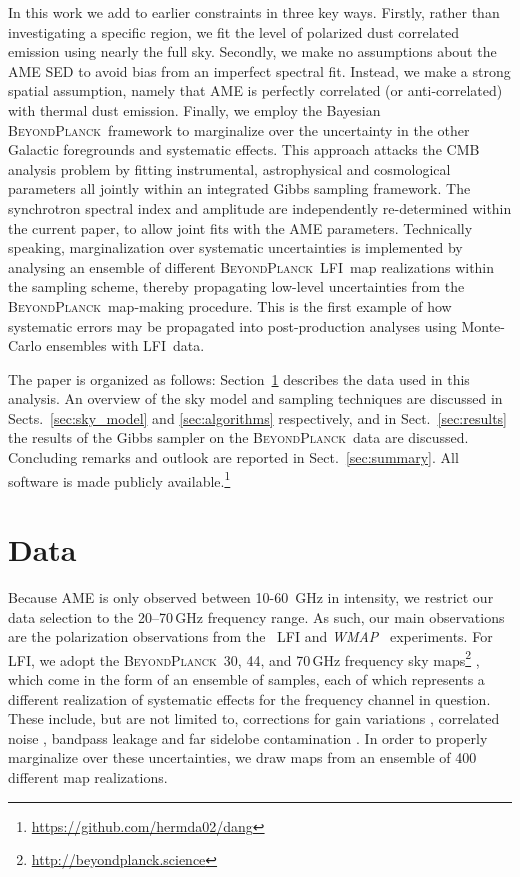 \documentclass[twocolumn]{aa}
\def\WMAP{\textit{WMAP}}
\newcommand{\BP}{\textsc{BeyondPlanck}}
\newcommand{\lfi}[0]{LFI}
\begin{document}
In this work we add to earlier constraints in three key ways. Firstly, rather than investigating a specific region, we fit the level of polarized dust correlated emission using nearly the full sky. Secondly, we make no assumptions about the AME SED to avoid bias from an imperfect spectral fit. Instead, we make a strong spatial assumption, namely that AME is perfectly correlated (or anti-correlated) with thermal dust emission. Finally, we employ the Bayesian \BP\ framework \citep{bp01} to marginalize over the uncertainty in the other Galactic foregrounds and systematic effects. This approach attacks the CMB analysis problem by fitting instrumental, astrophysical and cosmological parameters all jointly within an integrated Gibbs sampling framework. The synchrotron spectral index and amplitude are independently re-determined within the current paper, to allow joint fits with the AME parameters. Technically speaking, marginalization over systematic uncertainties is implemented by analysing an ensemble of different \BP\ \lfi\ map realizations within the sampling scheme, thereby propagating low-level uncertainties from the \BP\ map-making procedure. This is the first example of how systematic errors may be propagated into post-production analyses using Monte-Carlo ensembles with \lfi\ data.

The paper is organized as follows: Section~\ref{sec:data} describes the data used in this analysis. An overview of the sky model and sampling techniques are discussed in Sects.~\ref{sec:sky_model} and \ref{sec:algorithms} respectively, and in Sect.~\ref{sec:results} the results of the Gibbs sampler on the \BP\ data are discussed. Concluding remarks and outlook are reported in Sect.~\ref{sec:summary}. All software is made  publicly available.\footnote{\url{https://github.com/hermda02/dang}}

\section{Data}
\label{sec:data}

Because AME is only observed between 10-60~GHz in intensity, we restrict our data selection to the 20--70\,GHz frequency range. As such, our main observations are the polarization observations from the \Planck\ LFI \citep{planck2016-l02} and \WMAP\ \citep{bennett2012} experiments. For LFI, we adopt the \BP\ 30, 44, and 70\,GHz frequency sky maps\footnote{\url{http://beyondplanck.science}} \citep{bp01}, which come in the form of an ensemble of samples, each of which represents a different realization of systematic effects for the frequency channel in question. These include, but are not limited to, corrections for gain variations \citep{bp07}, correlated noise \citep{bp06}, bandpass leakage \citep{bp09} and far sidelobe contamination \citep{bp08}. In order to properly marginalize over these uncertainties, we draw maps from an ensemble of 400 different map realizations. 
\end{document}
